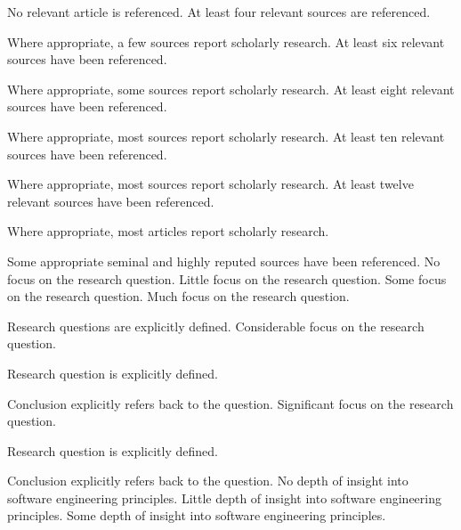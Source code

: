 \documentclass{../../../fal_assignment}
\begin{document}
\begin{markingrubric}
%
%
        \grade\fail 	No relevant article is referenced.
        \grade 		At least four relevant sources are referenced.
        \par		Where appropriate, a few sources report scholarly research.
        \grade 		At least six relevant sources have been referenced.
        \par		Where appropriate, some sources report scholarly research.
        \grade 		At least eight relevant sources have been referenced.
        \par		Where appropriate, most sources report scholarly research.
        \grade 		At least ten relevant sources have been referenced.
        \par		Where appropriate, most sources report scholarly research.
        \grade 		At least twelve relevant sources have been referenced.
        \par		Where appropriate, most articles report scholarly research.
        \par		Some appropriate seminal and highly reputed sources have been referenced.       
%
        \grade\fail 	No focus on the research question.
        \grade 		Little focus on the research question.
        \grade 		Some focus on the research question.
        \grade 		Much focus on the research question.
            \par 		Research questions are explicitly defined.
        \grade 		Considerable focus on the research question.
            \par 		Research question is explicitly defined.
            \par 		Conclusion explicitly refers back to the question.
        \grade 		Significant focus on the research question.
            \par 		Research question is explicitly defined.
            \par 		Conclusion explicitly refers back to the question.
%
        \grade\fail 	No depth of insight into software engineering principles.
        \grade 		Little depth of insight into software engineering principles.
        \grade 		Some depth of insight into software engineering principles.

\end{markingrubric}
\end{document}
